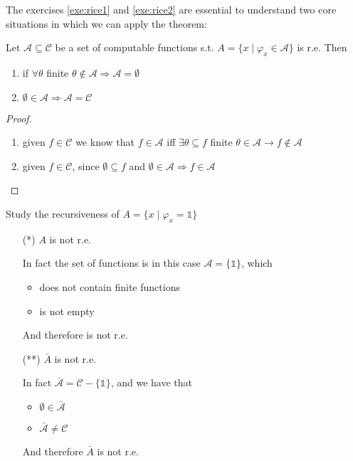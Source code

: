 The exercises \ref{exe:rice1} and \ref{exe:rice2} are essential to
understand two core situations in which we can apply the theorem:

\begin{observation}
  Let $\mathcal{A} \subseteq \mathcal{C}$ be a set of computable
  functions s.t. $A = \{ x \mid \varphi_x \in \mathcal{A}\}$ is
  r.e. Then
  \begin{enumerate}[label=(i)]
  \item if \(\forall \theta \) finite
    \( \theta \notin \mathcal{A} \Rightarrow \mathcal{A} = \emptyset\)
  \item
    \(\emptyset \in \mathcal{A} \Rightarrow \mathcal{A} =
    \mathcal{C}\)
  \end{enumerate}

  \begin{proof}
    \begin{enumerate}[label=(i)]
    \item given $f \in \mathcal{C}$ we know that $f \in \mathcal{A}$
      iff $\exists \theta \subseteq f$ finite
      $\theta \in \mathcal{A} \rightarrow f \notin \mathcal{A}$
    \item given $f \in \mathcal{C}$, since $\emptyset \subseteq f$ and
      $\emptyset \in \mathcal{A} \Rightarrow f \in \mathcal{A}$
    \end{enumerate}
  \end{proof}
\end{observation}

\begin{exercise}
  Study the recursiveness of $A = \{x \mid \varphi_x = \mathds{1}\}$

  \begin{enumerate}
  \item[(*)] $A$ is not r.e.

    In fact the set of functions is in this case
    $\mathcal{A} = \{\mathds{1}\}$, which
    \begin{itemize}
    \item does not contain finite functions
    \item is not empty
    \end{itemize}
    And therefore is not r.e.

  \item[(**)] $\bar{A}$ is not r.e.

    In fact $\bar{\mathcal{A}} = \mathcal{C} - \{\mathds{1}\}$, and we
    have that
    \begin{itemize}
    \item $\emptyset \in \bar{\mathcal{A}}$
    \item $\bar{\mathcal{A}} \neq \mathcal{C}$
    \end{itemize}
    And therefore $\bar{A}$ is not r.e.
  \end{enumerate}
\end{exercise}

